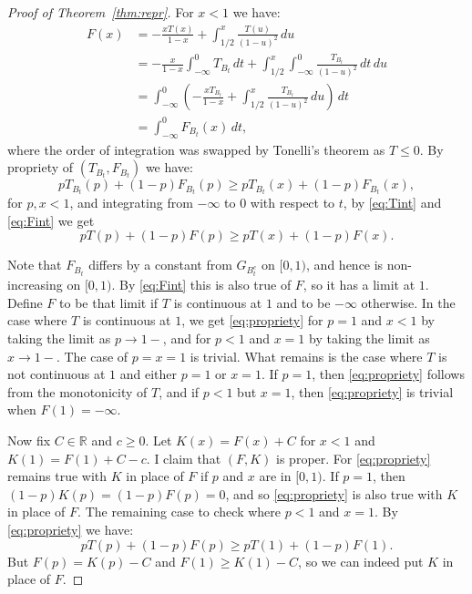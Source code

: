 \documentclass[10pt,a4paper]{amsart}
\def\R{\mathbb R}
\begin{document}
\begin{proof}[Proof of Theorem~\ref{thm:repr}]
For $x<1$ we have:
\begin{equation}\label{eq:Fint}
\begin{aligned}
	F(x) &= -\frac{xT(x)}{1-x}+\int_{1/2}^x \frac{T(u)}{(1-u)^2} \, du \\
		 &= -\frac{x}{1-x}\int_{-\infty}^0 T_{B_t} \, dt + \int_{1/2}^x \int_{-\infty}^0 \frac{T_{B_t}}{(1-u)^2} \, dt\, du \\
		 &= \int_{-\infty}^0 \left(-\frac{xT_{B_t}}{1-x}  + \int_{1/2}^x \frac{T_{B_t}}{(1-u)^2} \, du \right) \, dt\\
		 &= \int_{-\infty}^0 F_{B_t}(x) \, dt,
\end{aligned}		 
\end{equation}
where the order of integration was swapped by Tonelli's theorem as $T\le 0$. By propriety of
$(T_{B_t},F_{B_t})$ we have:
$$
	p T_{B_t}(p) + (1-p) F_{B_t}(p) \ge 
	p T_{B_t}(x) + (1-p) F_{B_t}(x),
$$
for $p,x<1$, 
and integrating from $-\infty$ to $0$ with respect to $t$, by \eqref{eq:Tint} and \eqref{eq:Fint} we get
\begin{equation}\label{eq:propriety}
	p T(p) + (1-p) F(p) \ge 
	p T(x) + (1-p) F(x).
\end{equation}

Note that $F_{B_t}$ differs by a constant from $G_{B_t^c}$ on $[0,1)$, and hence is non-increasing on $[0,1)$.
By \eqref{eq:Fint} this is also true of $F$, so it has a limit at $1$. Define $F$ to be that limit if
$T$ is continuous at $1$ and to be $-\infty$ otherwise. In the case where $T$ is continuous at $1$, we get
\eqref{eq:propriety} for $p=1$ and $x<1$ by taking the limit as $p\to 1-$, and for $p<1$ and $x=1$ by
taking the limit as $x\to 1-$. The case of $p=x=1$ is trivial. What remains is the case where $T$ is
not continuous at $1$ and either $p=1$ or $x=1$. If $p=1$, then \eqref{eq:propriety} follows
from the monotonicity of $T$, and if $p<1$ but $x=1$, then \eqref{eq:propriety} is trivial when
$F(1)=-\infty$.

Now fix $C\in\R$ and $c\ge 0$. Let $K(x)=F(x)+C$ for $x<1$ and $K(1)=F(1)+C-c$. I claim that $(F,K)$ is proper.
For \eqref{eq:propriety}
remains true with $K$ in place of $F$ if $p$ and $x$ are in $[0,1)$. If $p=1$, then $(1-p)K(p)=(1-p)F(p)=0$,
and so \eqref{eq:propriety} is also true with $K$ in place of $F$. The remaining case to check where $p<1$ and
$x=1$. By \eqref{eq:propriety} we have:
$$
	p T(p) + (1-p) F(p) \ge p T(1) + (1-p) F(1).
$$
But $F(p)=K(p)-C$ and $F(1)\ge K(1)-C$, so we can indeed put $K$ in place of $F$.


\end{proof}
\end{document}
